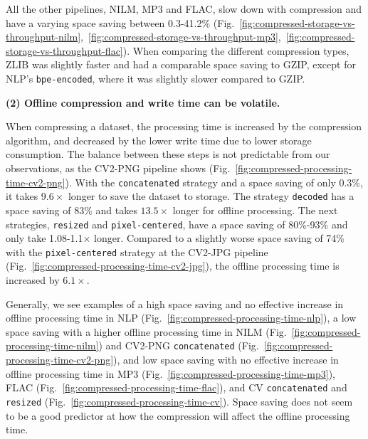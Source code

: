 {All the other pipelines, NILM, MP3 and FLAC, slow down with compression and have a varying space saving between 0.3-41.2\% (Fig.~\ref{fig:compressed-storage-vs-throughput-nilm},~\ref{fig:compressed-storage-vs-throughput-mp3},~\ref{fig:compressed-storage-vs-throughput-flac}).
When comparing the different compression types, ZLIB was slightly faster and had a comparable space saving to GZIP, except for NLP's \texttt{bpe-encoded}, where it was slightly slower compared to GZIP.

\textbf{(2) Offline compression and write time can be volatile. }

When compressing a dataset, the processing time is increased by the compression algorithm, and decreased by the lower write time due to lower storage consumption.
The balance between these steps is not predictable from our observations, as the CV2-PNG pipeline shows (Fig.~\ref{fig:compressed-processing-time-cv2-png}). 
With the \texttt{concatenated} strategy and a space saving of only 0.3\%, it takes $9.6\times$ longer to save the dataset to storage.
The strategy \texttt{decoded} has a space saving of 83\% and takes $13.5\times$ longer for offline processing.
The next strategies, \texttt{resized} and \texttt{pixel-centered}, have a space saving of 80\%-93\% and only take 1.08-1.1$\times$ longer.
Compared to a slightly worse space saving of 74\% with the \texttt{pixel-centered} strategy at the CV2-JPG pipeline (Fig.~\ref{fig:compressed-processing-time-cv2-jpg}), the offline processing time is increased by $6.1\times$. 

Generally, we see examples of a high space saving and no effective increase in offline processing time in NLP (Fig.~\ref{fig:compressed-processing-time-nlp}), a low space saving with a higher offline processing time in NILM (Fig.~\ref{fig:compressed-processing-time-nilm}) and CV2-PNG \texttt{concatenated} (Fig.~\ref{fig:compressed-processing-time-cv2-png}), and low space saving with no effective increase in offline processing time in MP3 (Fig.~\ref{fig:compressed-processing-time-mp3}), FLAC (Fig.~\ref{fig:compressed-processing-time-flac}), and CV \texttt{concatenated} and \texttt{resized} (Fig.~\ref{fig:compressed-processing-time-cv}). Space saving does not seem to be a good predictor at how the compression will affect the offline processing time.

}



